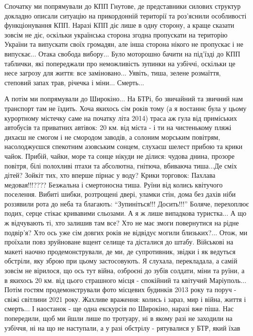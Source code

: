 Спочатку ми попрямували до КПП Гнутове, де представники силових структур
докладно описали ситуацію на прикордонній території та роз'яснили особливості
функціонування КПП. Наразі КПП діє лише в одну сторону, а краще сказати зовсім
не діє, оскільки українська сторона згодна пропускати на територію України та
випускати своїх громадян, але інша сторона нікого не пропускає і не випускає...
Отака свобода вибору... Було моторошно бачити на під'їзді до КПП таблички, які
попереджали про неможливість зупинки на узбіччі, оскільки це несе загрозу для
життя: все заміновано... Уявіть, тиша, зелене розмаїття, степовий запах трав,
річечка і міни... Смерть... 

А потім ми попрямували до Широкіно... На БТРі, бо звичайний та звичний нам
транспорт там не їздить. Хоча якихось сім років тому (а я востаннє була у цьому
курортному містечку саме на початку літа 2014) траса аж гула від приміських
автобусів та приватних автівок: 20 км. від міста - і ти на чистенькому пляжі
дихаєш не смогом і не смородом заводів, а солоним морським повітрям,
насолоджуєшся спекотним азовським сонцем, слухаєш шелест прибою та крики чайок.
Прибій, чайки, море та сонце нікуди не ділися: чудова днина, прозоре повітря,
білі полохливі птахи та абсолютна, гнітюча, вбиваюча тиша...Де сміх дітей?
Зойкіт тих, хто вперше пірнає у воду? Крики торговок: Пахлава медовая!!!????
Безжальна і смертоносна тиша. Руїни від колись квітучого поселення. Вибиті
шибки, розтрощені двері, уламки стін, дома без дахів ніби роззявили рота до
неба та благають: \enquote{Зупиніться!!! Досить!!!} Боляче, перехоплює подих, серце
стікає кривавими сльозами. А я ж лише випадкова туристка... А що ж відчувають
ті, хто залишив там все? Хто не має змоги повернутися на рідне подвір'я? Хто
ось уже сім довгих років не відвідує могили близьких?... Отож, ми проїхали повз
зруйноване вщент селище та дісталися до штабу. Військові на макеті наочно
продемонстрували, де ми, де супротивник, звідки і як ведуться обстріли, яку
зброю при цьому застосовують. Я слухала, перекладала, а самій зовсім не
вірилося, що ось тут війна, озброєні до зубів солдати, міни та руїни, а в
якихось 20 км. від цього страшного місця - спокійний та квітучий Маріуполь...
Потім гостям продемонстрували фото місцевих будинків 2013 року та поруч - свіжі
світлини 2021 року. Жахливе враження: колись і зараз, мир і війна, життя і
смерть... І наостанок - ще одна екскурсія по Широкіно, наразі вже піша. Нас
попередили, щоб ми йшли лише по тротуару, ні в якому разі не заходили на
узбіччя, ні на що не наступали, а у разі обстрілу - рятувалися у БТР, який їхав
